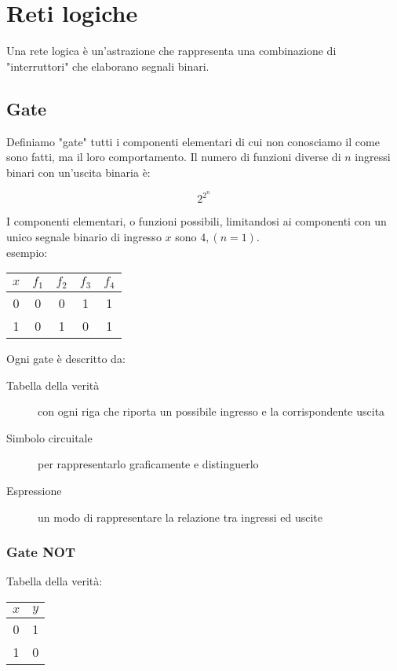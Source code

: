 \documentclass{article}
\begin{document}
\section{Reti logiche}

Una rete logica è un'astrazione che rappresenta una combinazione di "interruttori" che elaborano segnali binari.

\subsection{Gate}

Definiamo "gate" tutti i componenti elementari di cui non conosciamo il come sono fatti, ma il loro comportamento.
Il numero di funzioni diverse di $n$ ingressi binari con un'uscita binaria è:

$$
2^{2^n}
$$

\noindent
I componenti elementari, o funzioni possibili, limitandosi ai componenti con un unico segnale binario di ingresso $x$ sono $4, (n = 1)$.\\

\noindent
esempio:

\begin{center}
\begin{tabular}{ |c|c|c|c|c| }
\hline
$x$ & $f_1$ & $f_2$ & $f_3$ & $f_4$ \\
\hline
\hline
0 & 0 & 0 & 1 & 1 \\
1 & 0 & 1 & 0 & 1 \\
\hline
\end{tabular}
\end{center}

\noindent
Ogni gate è descritto da:

\begin{description}
	\item[Tabella della verità] con ogni riga che riporta un possibile ingresso e la corrispondente uscita
	\item[Simbolo circuitale] per rappresentarlo graficamente e distinguerlo
	\item[Espressione] un modo di rappresentare la relazione tra ingressi ed uscite
\end{description}

\subsubsection{Gate NOT}

Tabella della verità:

\begin{center}
\begin{tabular}{ |c|c| }
\hline
$x$ & $y$ \\
\hline
\hline
0 & 1 \\
1 & 0 \\
\hline
\end{tabular}
\end{center}
\end{document}

